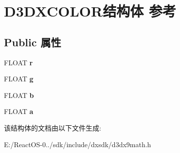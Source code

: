 \hypertarget{struct_d3_d_x_c_o_l_o_r}{}\section{D3\+D\+X\+C\+O\+L\+O\+R结构体 参考}
\label{struct_d3_d_x_c_o_l_o_r}
\subsection*{Public 属性}
\begin{DoxyCompactItemize}
\item 
\mbox{\label{struct_d3_d_x_c_o_l_o_r_ade40ee19c4d27a6392a43886b0d3690b}} 
F\+L\+O\+AT {\bfseries r}
\item 
\mbox{\label{struct_d3_d_x_c_o_l_o_r_a2fb26cb2455c9dc2560bb3e07c73b2c5}} 
F\+L\+O\+AT {\bfseries g}
\item 
\mbox{\label{struct_d3_d_x_c_o_l_o_r_adb2f7796578d0fb3689c58b6f8f0ec8a}} 
F\+L\+O\+AT {\bfseries b}
\item 
\mbox{\label{struct_d3_d_x_c_o_l_o_r_aafd8b8c636fbb5c2d40e0a4aadf9ce22}} 
F\+L\+O\+AT {\bfseries a}
\end{DoxyCompactItemize}


该结构体的文档由以下文件生成\+:\begin{DoxyCompactItemize}
\item 
E\+:/\+React\+O\+S-\/0../sdk/include/dxsdk/d3dx9math.\+h\end{DoxyCompactItemize}
